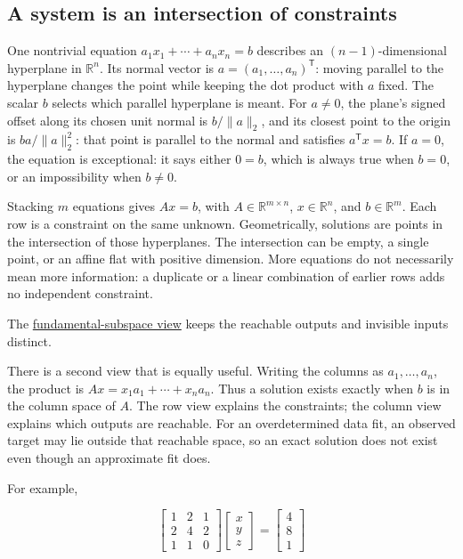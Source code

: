 \subsection{A system is an intersection of constraints}\label{01-foundations-i-ch019-a-system-is-an-intersection-of-constraints}

\hypertarget{01-foundations-i-ch019-a-system-is-an-intersection-of-constraints}{}

One nontrivial equation \(a_1x_1+\cdots+a_nx_n=b\) describes an \((n-1)\)-dimensional hyperplane in \(\mathbb R^n\). Its normal vector is \(a=(a_1,\ldots,a_n)^\mathsf T\): moving parallel to the hyperplane changes the point while keeping the dot product with \(a\) fixed. The scalar \(b\) selects which parallel hyperplane is meant. For \(a\ne0\), the plane's signed offset along its chosen unit normal is \(b/\|a\|_2\), and its closest point to the origin is \(ba/\|a\|_2^2\): that point is parallel to the normal and satisfies \(a^\mathsf Tx=b\). If \(a=0\), the equation is exceptional: it says either \(0=b\), which is always true when \(b=0\), or an impossibility when \(b\ne0\).

Stacking \(m\) equations gives \(Ax=b\), with \(A\in\mathbb R^{m\times n}\), \(x\in\mathbb R^n\), and \(b\in\mathbb R^m\). Each row is a constraint on the same unknown. Geometrically, solutions are points in the intersection of those hyperplanes. The intersection can be empty, a single point, or an affine flat with positive dimension. More equations do not necessarily mean more information: a duplicate or a linear combination of earlier rows adds no independent constraint.

The \hyperref[01-foundations-i-ch019-a-system-is-an-intersection-of-constraints]{fundamental-subspace view} keeps the reachable outputs and invisible inputs distinct.

There is a second view that is equally useful. Writing the columns as \(a_1,\ldots,a_n\), the product is \(Ax=x_1a_1+\cdots+x_na_n\). Thus a solution exists exactly when \(b\) is in the column space of \(A\). The row view explains the constraints; the column view explains which outputs are reachable. For an overdetermined data fit, an observed target may lie outside that reachable space, so an exact solution does not exist even though an approximate fit does.

For example,

\[
\begin{bmatrix}1&2&1\\2&4&2\\1&1&0\end{bmatrix}
\begin{bmatrix}x\\y\\z\end{bmatrix}
=\begin{bmatrix}4\\8\\1\end{bmatrix}
\]

